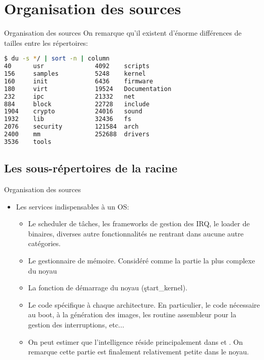 \section{Organisation des sources}

\begin{frame}[fragile=singleslide]{Organisation des sources}
  On remarque qu'il existent d'énorme différences de tailles entre les
  répertoires:
  \begin{lstlisting}[language=sh]
$ du -s */ | sort -n | column
40      usr              4092    scripts
156     samples          5248    kernel
160     init             6436    firmware
180     virt             19524   Documentation
232     ipc              21332   net
884     block            22728   include
1904    crypto           24016   sound
1932    lib              32436   fs
2076    security         121584  arch
2400    mm               252688  drivers
3536    tools
  \end{lstlisting} 
\end{frame}

\subsection{Les sous-répertoires de la racine}

\begin{frame}[fragile=singleslide]{Organisation des sources}
  \begin{itemize} 
  \item Les services indispensables à un OS:
    \begin{itemize} 
    \item  {} Le  scheduler  de tâches,  les frameworks  de
      gestion  des   IRQ,  le  loader  de   binaires,  diverses  autre
      fonctionnalités ne rentrant dans aucune autre catégories.
    \item  {} Le  gestionnaire de  mémoire. Considéré  comme la
      partie la plus complexe du noyau
    \item   {}   La    fonction   de   démarrage   du   noyau
      (\c{start_kernel}).
    \item  {} Le  code spécifique  à chaque  architecture. En
      particulier,  le code nécessaire  au boot,  à la  génération des
      images,   les   routine   assembleur   pour   la   gestion   des
      interruptions, etc...
    \item  On peut  estimer que  l'intelligence  réside principalement
      dans   et .  On remarque cette  partie est
      finalement relativement petite dans le noyau.
    \end{itemize} 
  \end{itemize}
\end{frame}


